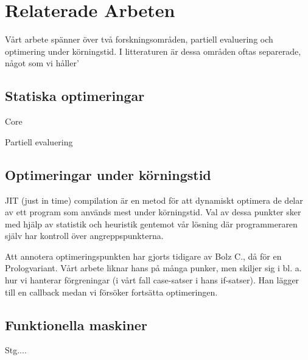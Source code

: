 \documentclass[Rapport]{subfiles}
\begin{document}
\section{Relaterade Arbeten}
Vårt arbete spänner över två forskningsområden, partiell evaluering
och optimering under körningstid. I litteraturen är dessa områden
oftas separerade, något som vi håller'


\subsection{Statiska optimeringar}

Core\cite{mitchell2007supercompiler}

Partiell evaluering


\subsection{Optimeringar under körningstid}

JIT (just in time) compilation är en metod för att dynamiskt optimera
de delar av ett program som används mest under körningstid. Val av
dessa punkter sker med hjälp av statistik och heuristik gentemot vår
lösning där programmeraren själv har kontroll över angreppspunkterna. 

Att annotera optimeringspunkten har gjorts tidigare av Bolz C., då
för en Prologvariant.\cite{bolz-automatic} Vårt arbete liknar hans
på många punker, men skiljer sig i bl. a. hur vi hanterar förgreningar
(i vårt fall case-satser i hans if-satser). Han lägger till en callback
medan vi försöker fortsätta optimeringen.


\subsection{Funktionella maskiner}

Stg....\cite{marlow2006making}


%

\end{document}
